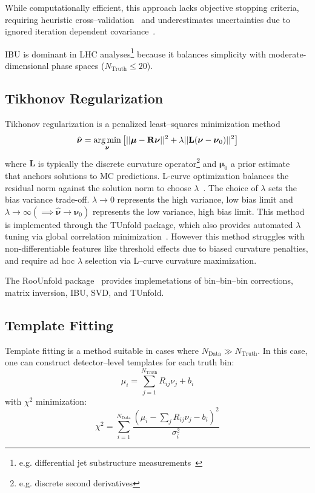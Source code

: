 While computationally efficient, this approach lacks objective stopping criteria, requiring heuristic cross--validation~\cite{cowan_survey_2002} and underestimates uncertainties due to ignored iteration dependent covariance~\cite{cowan_statistical_1998}.

IBU is dominant in LHC analyses\footnote{e.g. differential jet substructure measurements~\cite{atlas_collaboration_measurement_2024}} because it balances simplicity with moderate-dimensional phase spaces (\(N_{\text{Truth}} \leq 20\)).

\subsection{Tikhonov Regularization}  
Tikhonov regularization is a penalized least--squares minimization method
\begin{equation}
    \hat{\boldsymbol{\nu}} =\underset{\boldsymbol{\nu}}{\arg\min} \left[ ||\vb*{\mu} - \mathbf{R}\boldsymbol{\nu}||^2 + \lambda ||\mathbf{L}(\boldsymbol{\nu} - \boldsymbol{\nu}_0)||^2 \right]
\end{equation}  
where \(\mathbf{L}\) is typically the discrete curvature operator\footnote{e.g. discrete second derivatives} and \(\boldsymbol{\mu}_0\) a prior estimate~\cite{cowan_topics_2009} that anchors solutions to MC predictions.
%
L-curve optimization balances the residual norm against the solution norm to choose \(\lambda\)~\cite{cowan_highlights_2011}.
%
The choice of \(\lambda\) sets the bias variance trade-off.
%
\(\lambda \rightarrow 0\) represents the high variance, low bias limit and \(\lambda \rightarrow \infty (\implies \hat{\boldsymbol{\nu}} \rightarrow \boldsymbol{\nu}_0)\) represents the low variance, high bias limit.
%
This method is implemented through the TUnfold package, which also provides automated \(\lambda\) tuning via global correlation minimization~\cite{schmitt_tunfold_2012}.
%
However this method struggles with non-differentiable features like threshold effects due to biased curvature penalties, and require ad hoc \(\lambda\) selection via L--curve curvature maximization.

\begin{note}{The RooUnfold package~\cite{adye_unfolding_2011} provides implemetations of bin--bin--bin corrections, matrix inversion, IBU, SVD, and TUnfold.}
\end{note}
\subsection{Template Fitting}  
Template fitting is a method suitable in cases where \(N_{\text{Data}} \gg N_{\text{Truth}}\).
%
In this case, one can construct detector--level templates for each truth bin:  
\begin{equation}
    \mu_i = \sum_{j=1}^{N_{\text{Truth}}} R_{ij} \nu_j + b_i
\end{equation}  
with \(\chi^2\) minimization:  
\begin{equation}
    \chi^2 = \sum_{i=1}^{N_{\text{Data}}} \frac{(\mu_i - \sum_j R_{ij}\nu_j - b_i)^2}{\sigma_i^2}
\end{equation}  

